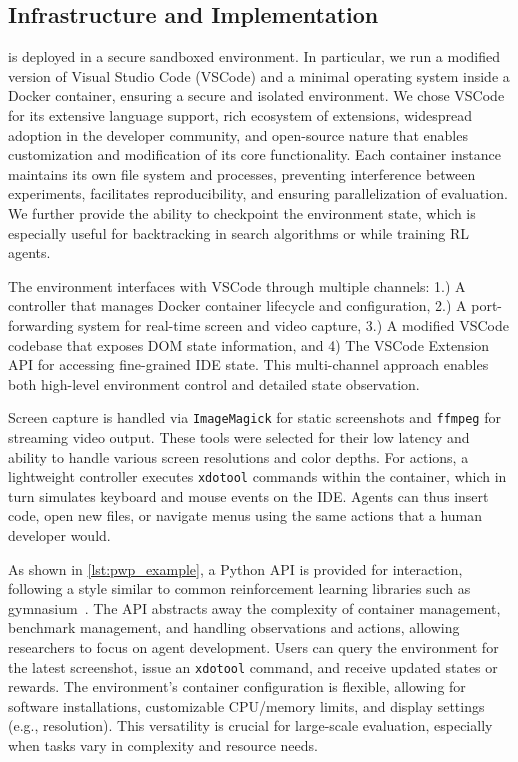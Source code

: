 \subsection{Infrastructure and Implementation}

\ours{} is deployed in a secure sandboxed environment.
In particular, we run a modified version of Visual Studio Code (VSCode) and a minimal operating system inside a Docker container, ensuring a secure and isolated environment.
We chose VSCode for its extensive language support, rich ecosystem of extensions, widespread adoption in the developer community, and open-source nature that enables customization and modification of its core functionality.
Each container instance maintains its own file system and processes, preventing interference between experiments, facilitates reproducibility, and ensuring parallelization of evaluation.
We further provide the ability to checkpoint the environment state, which is especially useful for backtracking in search algorithms or while training RL agents.

The environment interfaces with VSCode through multiple channels: 1.) A controller that manages Docker container lifecycle and configuration, 2.) A port-forwarding system for real-time screen and video capture, 3.) A modified VSCode codebase that exposes DOM state information, and 4) The VSCode Extension API for accessing fine-grained IDE state.
This multi-channel approach enables both high-level environment control and detailed state observation.

Screen capture is handled via \texttt{ImageMagick} for static screenshots and \texttt{ffmpeg} for streaming video output.
These tools were selected for their low latency and ability to handle various screen resolutions and color depths.
For actions, a lightweight controller executes \texttt{xdotool} commands within the container, which in turn simulates keyboard and mouse events on the IDE.
Agents can thus insert code, open new files, or navigate menus using the same actions that a human developer would.

As shown in \ref{lst:pwp_example}, a Python API is provided for interaction, following a style similar to common reinforcement learning libraries such as gymnasium~\cite{towers2024gymnasiumstandardinterfacereinforcement}.
The API abstracts away the complexity of container management, benchmark management, and handling observations and actions, allowing researchers to focus on agent development.
Users can query the environment for the latest screenshot, issue an \texttt{xdotool} command, and receive updated states or rewards.
The environment's container configuration is flexible, allowing for software installations, customizable CPU/memory limits, and display settings (e.g., resolution).
This versatility is crucial for large-scale evaluation, especially when tasks vary in complexity and resource needs.
